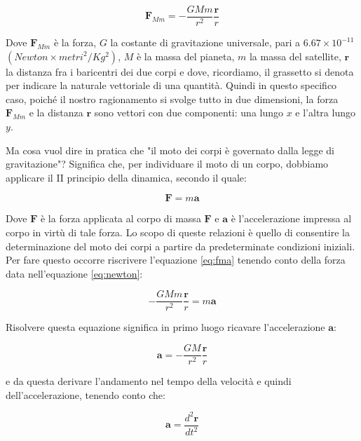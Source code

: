 \begin{equation} \label{eq:newton}
\mathbf{F}_{Mm}=-\frac{GMm}{r^2}\frac{\mathbf{r}}{r}
\end{equation}

Dove $\mathbf{F}_{Mm}$ è la forza, $G$ la costante di gravitazione universale, pari a $6.67\times 10^{-11}$ $(Newton \times metri^2 / Kg^2) $, $M$ è la massa del pianeta, $m$ la massa del satellite, $\mathbf{r}$ la distanza fra i baricentri dei due corpi e dove, ricordiamo, il grassetto si denota per indicare la naturale vettoriale di una quantità. Quindi in questo specifico caso, poiché il nostro ragionamento si svolge tutto in due dimensioni, la forza $\mathbf{F}_{Mm}$ e la distanza $\mathbf{r}$ sono vettori con due componenti: una lungo $x$ e l'altra lungo $y$. 

Ma cosa vuol dire in pratica che "il moto dei corpi è governato dalla legge di gravitazione"? Significa che, per individuare il moto di un corpo, dobbiamo applicare il II principio della dinamica, secondo il quale:

\begin{equation} \label{eq:fma}
\mathbf{F}=m\mathbf{a}
\end{equation}

Dove $\mathbf{F}$ è la forza applicata al corpo di massa $\mathbf{F}$ e $\mathbf{a}$ è l'accelerazione impressa al corpo in virtù di tale forza. Lo scopo di queste relazioni è quello di consentire la determinazione del moto dei corpi a partire da predeterminate condizioni iniziali. Per fare questo occorre riscrivere l'equazione \ref{eq:fma} tenendo conto della forza data nell'equazione \ref{eq:newton}:

\begin{equation}
-\frac{GMm}{r^2}\frac{\mathbf{r}}{r}=m\mathbf{a}
\end{equation}

Risolvere questa equazione significa in primo luogo ricavare l'accelerazione $\mathbf{a}$:

\begin{equation} \label{eq:acc}
\mathbf{a}=-\frac{GM}{r^2}\frac{\mathbf{r}}{r}
\end{equation}

e da questa derivare l'andamento nel tempo della velocità e quindi dell'accelerazione, tenendo conto che:

\begin{equation}
\mathbf{a}=\frac{d^2\mathbf{r}}{dt^2}
\end{equation}

